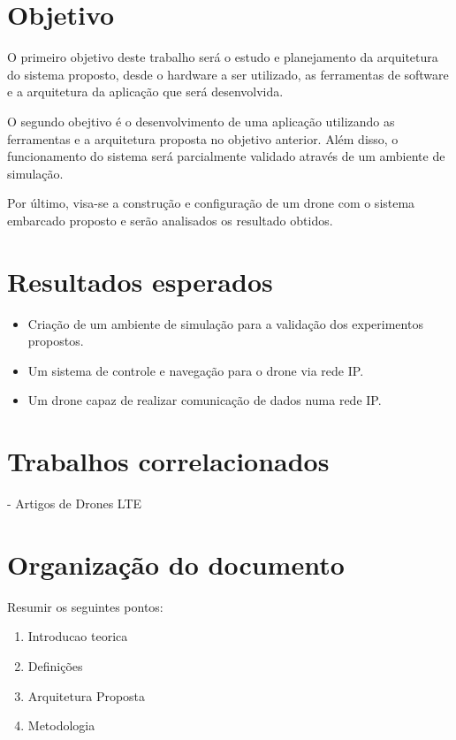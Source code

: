 \documentclass[12pt,a4paper,oneside]{book}
\begin{document}
\section{Objetivo}

O primeiro objetivo deste trabalho será o estudo e planejamento da arquitetura do sistema proposto, desde o hardware a ser utilizado, as ferramentas de software e a arquitetura da aplicação que será desenvolvida.

O segundo obejtivo é o desenvolvimento de uma aplicação utilizando as ferramentas e a arquitetura proposta no objetivo anterior. Além disso, o funcionamento do sistema será parcialmente validado através de um ambiente de simulação.

Por último, visa-se a construção e configuração de um drone com o sistema embarcado proposto e serão analisados os resultado obtidos.  

\section{Resultados esperados}

\begin{itemize}
\item Criação de um ambiente de simulação para a validação dos experimentos propostos.
\item Um sistema de controle e navegação para o drone via rede IP.
\item Um drone capaz de realizar comunicação de dados numa rede IP.    
\end{itemize}

\section{Trabalhos correlacionados}

 - Artigos de Drones LTE
 \cite{artigo_relacionado_1}

\section{Organização do documento}
Resumir os seguintes pontos:
\begin{enumerate}
    \item Introducao teorica
    \item Definições
    \item Arquitetura Proposta
    \item Metodologia
\end{enumerate}
\end{document}
